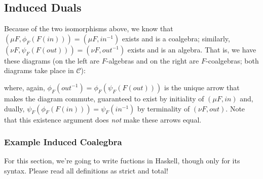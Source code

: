 \documentclass[letterpaper]{article}
\begin{document}
\subsection{Induced Duals}

Because of the two isomorphisms above, we know that $(\mu F, \phi_F(F(in))) =
(\mu F, in^{-1})$ exists and is a coalgebra; similarly, $(\nu F,
\psi_F(F(out))) = (\nu F, out^{-1})$ exists and is an algebra.  That is, we
have these diagrams (on the left are $F$-algebras and on the right are
$F$-coalgebras; both diagrams take place in $\mathcal{C}$):
%
\begin{center}\end{center}
%
where, again, $\phi_F(out^{-1}) = \phi_F(\psi_F(F(out)))$ is the unique arrow that
makes the diagram commute, guaranteed to exist by initiality of $(\mu F,
in)$ and, dually, $\psi_F(\phi_F(F(in))) = \psi_F(in^{-1})$ by terminality of
$(\nu F, out)$.  Note that this existence argument does {\em not} make these
arrows equal.

\subsubsection{Example Induced Coalegbra}

For this section, we're going to write fuctions in Haskell, though only for
its syntax.  Please read all definitions as strict and total!
\end{document}
